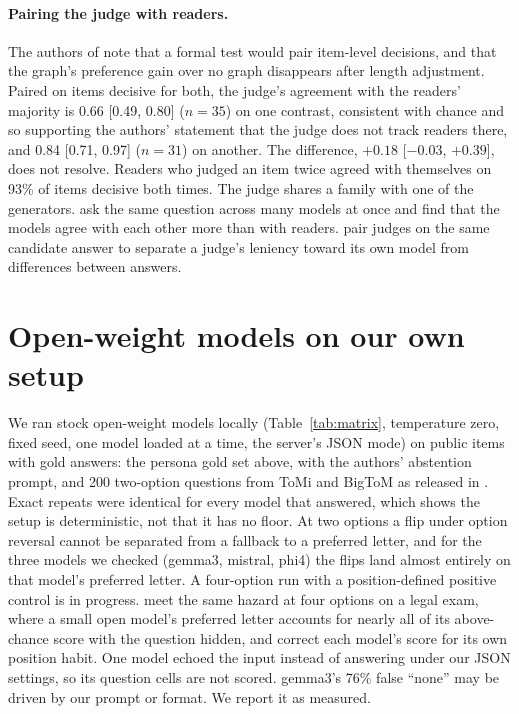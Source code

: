 \documentclass[11pt]{article}
\begin{document}
\paragraph{Pairing the judge with readers.} The authors of \citep{r2610_21468} note that a formal test would pair item-level decisions, and
that the graph's preference gain over no graph disappears after length adjustment. Paired on items decisive for both, the judge's agreement with the readers' majority is
0.66 [0.49, 0.80] ($n=35$) on one contrast, consistent with chance and so supporting the authors' statement that the judge does not track
readers there, and 0.84 [0.71, 0.97] ($n=31$) on another. The difference, $+0.18$ [$-0.03$, $+0.39$], does not resolve. Readers who judged an
item twice agreed with themselves on 93\% of items decisive both times. The judge shares a family with one of the generators. \citet{r2607_29274}
ask the same question across many models at once and find that the models agree with each other more than with readers.
\citet{r2607_10626} pair judges on the same candidate answer to separate a judge's leniency toward its own model from differences between
answers.

\section{Open-weight models on our own setup}
We ran stock open-weight models locally (Table~\ref{tab:matrix}, temperature zero, fixed seed, one model loaded at a time, the server's JSON mode) on public items with
gold answers: the persona gold set above, with the authors' abstention prompt, and 200 two-option questions from ToMi and BigToM as released in
\citep{r2610_18610}. Exact repeats were identical for every model that answered, which shows the setup is deterministic, not that it has no
floor. At two options a flip under option reversal cannot be separated from a fallback to a preferred letter, and for the three models we
checked (gemma3, mistral, phi4) the flips land almost entirely on that model's preferred letter. A four-option run with a position-defined
positive control is in progress. \citet{r2608_15428} meet the same hazard at four options on a legal exam, where a small open model's
preferred letter accounts for nearly all of its above-chance score with the question hidden, and correct each model's score for its own
position habit. One model echoed the input instead of answering under our JSON settings, so its question cells are not scored.
gemma3's 76\% false ``none'' may be driven by our prompt or format. We report it as measured.
\end{document}
